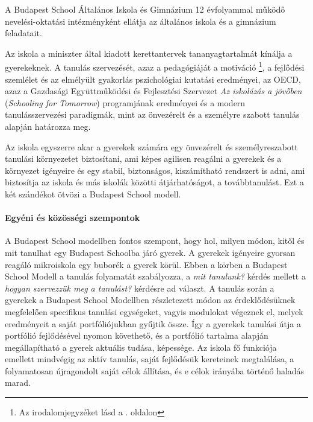 A Budapest School Általános Iskola és Gimnázium 12 évfolyammal működő nevelési-oktatási intézményként ellátja az általános iskola és a gimnázium feladatait.

Az iskola a miniszter által kiadott kerettantervek tananyagtartalmát kínálja a gyerekeknek. A tanulás szervezését, azaz a pedagógiáját a motiváció \citep{pink2011drive}\footnote{Az irodalomjegyzéket lásd a \pageref{sec:bibliographyk}. oldalon}, a fejlődési szemlélet \citep{growthmindset} és az elmélyült gyakorlás \citep{ericsson2016peak} pszichológiai kutatási eredményei, az  OECD, azaz a Gazdasági Együttműködési és Fejlesztési Szervezet \emph{Az iskolázás a jövőben}  (\emph{Schooling for Tomorrow}) programjának eredményei \citep{2006schooling} és a modern tanulásszervezési paradigmák, mint az önvezérelt \citep{mitra2012beyond} és a személyre szabott \citep{khan2012one} tanulás alapján határozza meg.

Az iskola egyszerre akar a gyerekek számára egy önvezérelt és személyreszabott tanulási környezetet biztosítani, ami képes agilisen reagálni a gyerekek és a környezet igényeire és egy stabil, biztonságos, kiszámítható rendszert is adni, ami biztosítja az iskola és más iskolák közötti átjárhatóságot, a továbbtanulást. Ezt a két szándékot ötvözi a Budapest School modell.

\clearpage


\paragraph{Egyéni és közösségi szempontok} A Budapest School modellben fontos szempont, hogy
hol, milyen
módon, kitől és mit tanulhat egy Budapest Schoolba járó gyerek.
A gyerekek igényeire gyorsan reagáló mikroiskola egy buborék a gyerek körül. Ebben a körben a Budapest School Modell a tanulás folyamatát szabályozza, a \emph{mit tanulunk?} kérdés mellett a \emph{hogyan szervezzük meg a tanulást?} kérdésre ad választ. A tanulás során a gyerekek a Budapest School Modellben részletezett módon az érdeklődésüknek megfelelően specifikus tanulási egységeket, vagyis modulokat végeznek el, melyek eredményeit a saját portfóliójukban gyűjtik össze. Így a gyerekek tanulási útja a portfólió fejlődésével nyomon követhető, és a portfólió tartalma alapján megállapítható a gyerek aktuális tudása, képessége. Az iskola fő funkciója emellett mindvégig az aktív tanulás, saját fejlődésük kereteinek megtalálása, a folyamatosan újragondolt saját célok állítása, és e célok irányába történő haladás marad.
 
